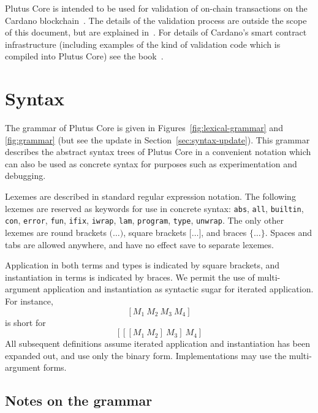 \documentclass[a4paper]{article}
\begin{document}
Plutus Core is intended to be used for validation of on-chain
transactions on the Cardano blockchain~\citep{Cardano}.  The details
of the validation process are outside the scope of this document, but
are explained in~\citep{EUTXO}. For details of Cardano's smart
contract infrastructure (including examples of the kind of validation
code which is compiled into Plutus Core) see the
book~\citep{Plutus-book}.



\section{Syntax}

The grammar of Plutus Core is given in
Figures~\ref{fig:lexical-grammar} and
\ref{fig:grammar} (but see the update in Section~\ref{sec:syntax-update}).
This grammar describes the abstract syntax trees of Plutus Core in a convenient
notation which can also be used as concrete syntax for purposes such as
experimentation and debugging.

Lexemes are described in standard regular expression notation.  The
following lexemes are reserved as keywords for use in concrete syntax:
\texttt{abs}, \texttt{all}, \texttt{builtin}, 
\texttt{con}, \texttt{error}, \texttt{fun}, \texttt{ifix},
\texttt{iwrap}, \texttt{lam}, \texttt{program},
\texttt{type}, \texttt{unwrap}.  The only other lexemes
are round brackets $\texttt{(}\ldots\texttt{)}$, square brackets
$\texttt{[}\ldots\texttt{]}$, and braces
$\texttt{\{}\ldots\texttt{\}}$.  Spaces and tabs are allowed anywhere,
and have no effect save to separate lexemes.

Application in both terms and types is indicated by square
brackets, and instantiation in terms is indicated by braces. We
permit the use of multi-argument application and instantiation as
syntactic sugar for iterated application.
For instance,
\[
  [M_1 ~ M_2 ~ M_3 ~ M_4]
  \]
\noindent is short for
\[
  [[[M_1 ~ M_2] ~ M_3] ~ M_4]
\]
All subsequent definitions assume iterated application and instantiation
has been expanded out, and use only the binary form. Implementations
may use the multi-argument forms.






\newcommand\fixtype[1]{\mu\,\alpha.#1}  %

\subsection{Notes on the grammar}
\end{document}
